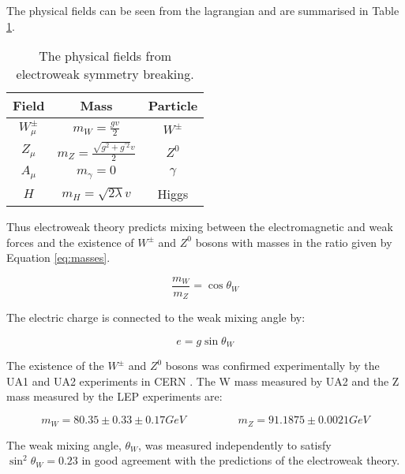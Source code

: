 The physical fields can be seen from the lagrangian and are summarised in Table
\ref{tab:physical}. \\

\begin{table}
\begin{center}
\begin{tabular}{|c|c|c|}
\hline
Field & Mass & Particle \\
\hline
$W_{\mu}^{\pm}$ & $m_{W} = \frac{gv}{2}$ & $W^{\pm}$ \\
$Z_{\mu}$ & $m_{Z} = \frac{\sqrt{g^{2} + g^{\prime 2}}v}{2}$ & $Z^{0}$ \\
$A_{\mu}$ & $m_{\gamma} = 0$ & $\gamma$ \\
$H$ & $m_{H} = \sqrt{2\lambda}v$ & Higgs \\
\hline
\end{tabular}
\end{center}
\caption{The physical fields from electroweak symmetry breaking.}
\label{tab:physical}
\end{table} 

Thus electroweak theory predicts mixing between the electromagnetic and weak 
forces and the existence of $W^{\pm}$ and $Z^{0}$ bosons with masses in the 
ratio given by Equation \ref{eq:masses}. 

\begin{equation}
\frac{m_{W}}{m_{Z}} = \cos\theta_{W}
\label{eq:masses}
\end{equation}

The electric charge is connected to the weak mixing angle by:

\begin{equation}
e = g\sin\theta_{W}
\end{equation}

The existence of the $W^{\pm}$ and $Z^{0}$ bosons was confirmed experimentally 
by the UA1 and UA2 experiments in CERN \cite{ua1}. The W mass measured by UA2
\cite{ua2} and the Z mass measured by the LEP experiments \cite{lep} are:

\begin{equation}
m_{W} = 80.35\pm0.33\pm0.17 \unit{GeV} \hspace{2cm} m_{Z} = 91.1875\pm0.0021 
\unit{GeV}
\end{equation}

The weak mixing angle, $\theta_{W}$, was measured independently \cite{sinthetaw} 
to satisfy $\sin^{2}\theta_{W} = 0.23$ in good agreement with the predictions of 
the electroweak theory. \\

